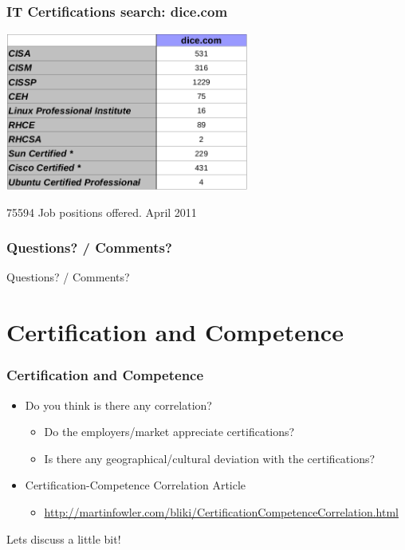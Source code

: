 \documentclass{beamer}
\begin{document}
\begin{frame}
\frametitle{IT Certifications search: dice.com}
\begin{center}
  \includegraphics[width=8cm]{figs/dice.png}
\end{center}
\begin{center}
\normalsize{75594 Job positions offered. April 2011}
\end{center}
\end{frame}


\begin{frame}
\frametitle{Questions? / Comments?}
\begin{center}
\huge{Questions? / Comments?}
\end{center}
\end{frame}


\section{Certification and Competence}


\begin{frame}
\frametitle{Certification and Competence}
\begin{itemize}
\item Do you think is there any correlation?
    \begin{itemize}
    \item Do the employers/market appreciate certifications?
    \item Is there any geographical/cultural deviation with the certifications?
    \end{itemize}
\item Certification-Competence Correlation Article
    \begin{itemize}
    \item \url{http://martinfowler.com/bliki/CertificationCompetenceCorrelation.html}
    \end{itemize}
\end{itemize}

\begin{center}
\huge{Lets discuss a little bit!}
\end{center}

\end{frame}
\end{document}
